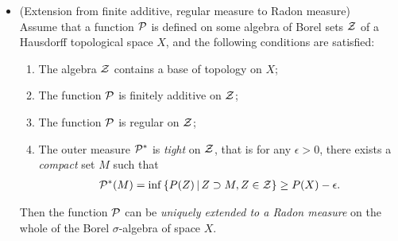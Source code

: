 \documentclass[11pt]{article}
\begin{document}
\begin{itemize}
\vspace{15pt}
\item \begin{theorem} \label{thm: fini_add2_count_add} (Extension from finite additive, regular measure to Radon measure) \\
Assume that a function ${\mathcal P}$ is defined on some algebra of Borel sets ${\mathcal Z}$ of a Hausdorff  topological space $X$, and the following conditions are satisfied:
\begin{enumerate}
\item The algebra ${\mathcal Z}$ contains a base of topology on $X$;
\item The function ${\mathcal P}$ is finitely additive on ${\mathcal Z}$;
\item The function ${\mathcal P}$ is regular on ${\mathcal Z}$;
\item The outer measure ${\mathcal P}^{*}$ is \emph{tight} on ${\mathcal Z}$, that is for any $\epsilon>0$, there exists a \emph{compact} set $M$ such that
\begin{align*}
{\mathcal P}^{*}(M) = \inf\left\{P(Z)\,|\, Z\supset M, Z\in{\mathcal Z} \right\} \ge P(X) - \epsilon.
\end{align*}
\end{enumerate} 
Then the function ${\mathcal P}$ can be \emph{uniquely extended to a Radon measure} on the whole of the Borel $\sigma$-algebra of space $X$.
\end{theorem}
\end{itemize}
\newpage
\end{document}
